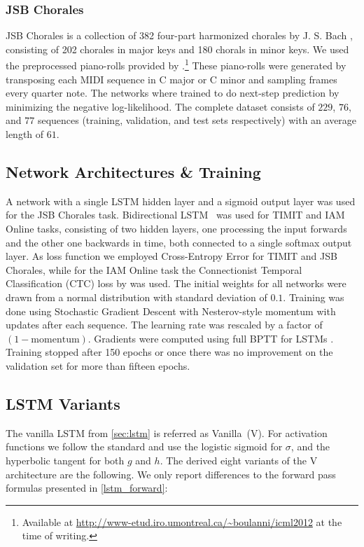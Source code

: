\subsubsection*{JSB Chorales} JSB Chorales is a collection of 382 four-part harmonized chorales by J. S. Bach \citep{Allan2005}, consisting of 202 chorales in major keys and 180 chorals in minor keys. We used the preprocessed piano-rolls provided by \citet{Boulanger-Lewandowski2012}.\footnote{Available at \url{http://www-etud.iro.umontreal.ca/~boulanni/icml2012} at the time of writing.} These piano-rolls were generated by transposing each MIDI sequence in C major or C minor and sampling frames every quarter note. The networks where trained to do next-step prediction by minimizing the negative log-likelihood. The complete dataset consists of $229$, $76$, and $77$ sequences (training, validation, and test sets respectively) with an average length of $61$.

\subsection{Network Architectures \& Training}\label{sec:arch-training}
A network with a single LSTM hidden layer and a sigmoid output layer was used for the JSB Chorales task. Bidirectional LSTM~\cite{Graves2005} was used for TIMIT and IAM Online tasks, consisting of two hidden layers, one processing the input forwards and the other one backwards in time, both connected to a single softmax output layer. As loss function we employed Cross-Entropy Error for TIMIT and JSB Chorales, while for the IAM Online task the Connectionist Temporal Classification (CTC) loss by \citet{Graves2006} was used. The initial weights for all networks were drawn from a normal distribution with standard deviation of $0.1$. Training was done using Stochastic Gradient Descent with Nesterov-style momentum \cite{Sutskever2013} with updates after each sequence. The learning rate was rescaled by a factor of $(1-\text{momentum})$. Gradients were computed using full BPTT for LSTMs \cite{Graves2005}. Training stopped after 150 epochs or once there was no improvement on the validation set for more than fifteen epochs.

\subsection{LSTM Variants}
\label{sec:lstm-variants}
The vanilla LSTM from \autoref{sec:lstm} is referred as Vanilla~(V). For activation functions we follow the standard and use the logistic sigmoid for $\sigma$, and the hyperbolic tangent for both $g$ and $h$. The derived eight variants of the V architecture are the following. We only report differences to the forward pass formulas presented in \autoref{lstm_forward}:

